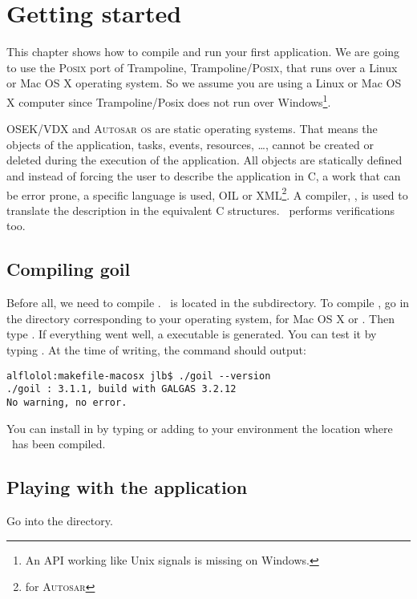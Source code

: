 
\chapter{Getting started}

This chapter shows how to compile and run your first application. We are going to use the \textsc{Posix} port of Trampoline, Trampoline/\textsc{Posix}, that runs over a Linux or Mac OS X operating system. So we assume you are using a Linux or Mac OS X computer since Trampoline/Posix does not run over Windows\footnote{An API working like Unix signals is missing on Windows.}.

OSEK/VDX and \textsc{Autosar os} are static operating systems. That means the objects of the application, tasks, events, resources, \ldots, cannot be created or deleted during the execution of the application. All objects are statically defined and instead of forcing the user to describe the application in C, a work that can be error prone, a specific language is used, OIL or XML\footnote{for \textsc{Autosar}}. A compiler, \goil, is used to translate the description in the equivalent C structures. \goil\ performs verifications too.

\section{Compiling goil}

Before all, we need to compile . \goil\ is located in the  subdirectory. To compile \goil, go in the directory corresponding to your operating system,  for Mac OS X or . Then type . If everything went well, a  executable is generated. You can test it by typing . At the time of writing, the command should output:

\begin{verbatim}
alflolol:makefile-macosx jlb$ ./goil --version
./goil : 3.1.1, build with GALGAS 3.2.12
No warning, no error.
\end{verbatim}

You can install  in  by typing  or adding to your  environment the location where \goil\ has been compiled.

\section{Playing with the  application}

Go into the  directory.
